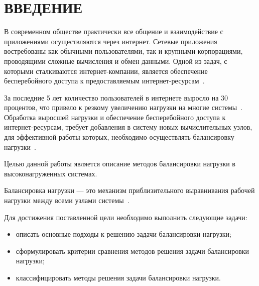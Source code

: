 \chapter*{ВВЕДЕНИЕ}

В современном обществе практически все общение и взаимодействие с приложениями осуществляются через интернет. 
Сетевые приложения востребованы как обычными пользователями, так и крупными корпорациями, проводящими сложные вычисления и обмен данными.
Одной из задач, с которыми сталкиваются интернет-компании, является обеспечение бесперебойного доступа к предоставляемым интернет-ресурсам~\cite{webact}.

За последние 5 лет количество пользователей в интернете выросло на 30 процентов, что привело к резкому увеличению нагрузки на многие системы~\cite{statistics}.
Обработка выросшей нагрузки и обеспечение бесперебойного доступа к интернет-ресурсам, требует добавления в систему новых вычислительных узлов, для эффективной работы которых, необходимо осуществлять балансировку нагрузки~\cite{strategies, com_analysis, gaud, part_algos}.

Целью данной работы является описание методов балансировки нагрузки в высоконагруженных системах.

Балансировка нагрузки --- это механизм приблизительного выравнивания рабочей нагрузки между всеми узлами системы~\cite{anal, gaud}.

Для достижения поставленной цели необходимо выполнить следующие задачи:
\begin{itemize}
	\item описать основные подходы к решению задачи балансировки нагрузки;
	\item сформулировать критерии сравнения методов решения задачи балансировки нагрузки;
	\item классифицировать методы решения задачи балансировки нагрузки.
\end{itemize}

